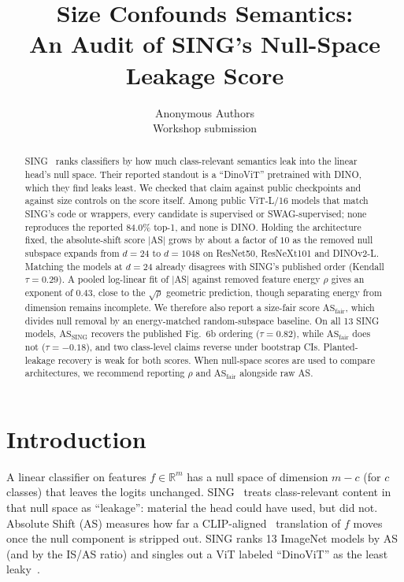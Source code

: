 \documentclass[10pt,twocolumn]{article}
\title{\vspace{-0.6em}Size Confounds Semantics:\\
An Audit of SING's Null-Space Leakage Score\vspace{-0.4em}}
\author{
Anonymous Authors\\
Workshop submission
}
\date{}
\begin{document}
\maketitle
\vspace{-1.2em}

\begin{abstract}
\vspace{-0.3em}
SING~\citep{sing2026} ranks classifiers by how much class-relevant semantics leak into the linear head's null space. Their reported standout is a ``DinoViT'' pretrained with DINO, which they find leaks least.
We checked that claim against public checkpoints and against size controls on the score itself.
Among public ViT-L/16 models that match SING's code or wrappers, every candidate is supervised or SWAG-supervised; none reproduces the reported 84.0\% top-1, and none is DINO.
Holding the architecture fixed, the absolute-shift score $|$AS$|$ grows by about a factor of $10$ as the removed null subspace expands from $d{=}24$ to $d{=}1048$ on ResNet50, ResNeXt101 and DINOv2-L. Matching the models at $d{=}24$ already disagrees with SING's published order (Kendall $\tau{=}0.29$).
A pooled log-linear fit of $|$AS$|$ against removed feature energy $\rho$ gives an exponent of $0.43$, close to the $\sqrt{\rho}$ geometric prediction, though separating energy from dimension remains incomplete.
We therefore also report a size-fair score $\mathrm{AS}_{\mathrm{fair}}$, which divides null removal by an energy-matched random-subspace baseline.
On all 13 SING models, $\mathrm{AS}_{\mathrm{SING}}$ recovers the published Fig.~6b ordering ($\tau{=}0.82$), while $\mathrm{AS}_{\mathrm{fair}}$ does not ($\tau{=}{-}0.18$), and two class-level claims reverse under bootstrap CIs.
Planted-leakage recovery is weak for both scores.
When null-space scores are used to compare architectures, we recommend reporting $\rho$ and $\mathrm{AS}_{\mathrm{fair}}$ alongside raw AS.
\vspace{-0.3em}
\end{abstract}

\section{Introduction}
\vspace{-0.2em}
A linear classifier on features $f\in\mathbb{R}^m$ has a null space of dimension $m{-}c$ (for $c$ classes) that leaves the logits unchanged.
SING~\citep{sing2026} treats class-relevant content in that null space as ``leakage'': material the head could have used, but did not.
Absolute Shift (AS) measures how far a CLIP-aligned~\citep{clip2021} translation of $f$ moves once the null component is stripped out. SING ranks 13 ImageNet models by AS (and by the IS/AS ratio) and singles out a ViT labeled ``DinoViT'' as the least leaky~\citep{dino2021}.
\end{document}
